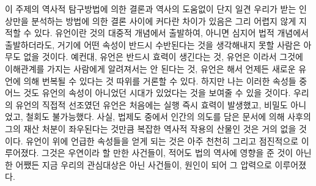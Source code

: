 이 주제의 역사적 탐구방법에 의한 결론과
%
역사의 도움없이 단지
일견 우리가 받는 인상만을 분석하는 방법에 의한
결론 사이에
커다란 차이가 있음은 그리 어렵지 않게 지적할 수 있다.
유언이란 것의 대중적 개념에서 출발하여,
아니면 심지어 법적 개념에서 출발하더라도,
거기에 어떤 속성이 반드시 수반된다는 것을 생각해내지 못할 사람은
아무도 없을 것이다.
예컨대, 유언은 반드시 
효력이 생긴다는 것, 유언은 이라서
그것에 이해관계를 가지는 사람에게 알려져서는 안 된다는 것,
유언은 해서
언제든 새로운 유언에 의해 번복될 수 있다는 것 따위를 거론할 수 있다.
하지만 나는 이러한 속성들 중 어느 것도 유언의 속성이 아니었던 시대가
있었다는 것을 보여줄 수 있을 것이다.
우리의 유언의 직접적 선조였던 유언은 처음에는
실행 즉시 효력이 발생했고, 비밀도 아니었고, 철회도 불가능했다.
사실,
법제도 중에서
인간의 의도를 담은 문서에 의해 사후의 그의 재산 처분이
좌우된다는 것만큼 복잡한 역사적 작용의 산물인 것은 거의 없을 것이다.
유언이
위에 언급한 속성들을 얻게 되는 것은
아주 천천히 그리고 점진적으로 이루어졌다.
그것은
우연이라 할 만한 사건들이,
적어도 법의 역사에 영향을 준 것이 아닌 한
어쨌든 지금 우리의 관심대상은 아닌 사건들이,
원인이 되어 그 압력으로 이루어졌다.

